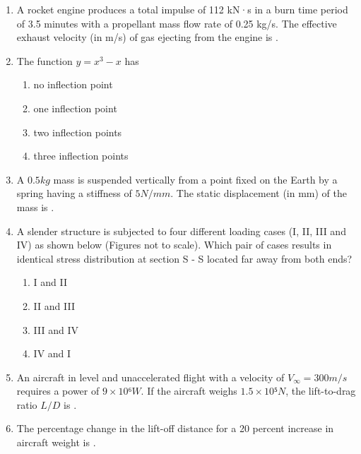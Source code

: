 \documentclass{article}
\begin{document}
\begin{enumerate}
\item A rocket engine produces a total impulse of 112 kN·s in a burn time period of 3.5 minutes with a propellant mass flow rate of 0.25 kg/s. The effective exhaust velocity (in m/s) of gas ejecting from the engine is \underline{\hspace{2cm}}.


\item The function $y = x^3 - x$ has

\begin{multicols}{4}
\begin{enumerate}
\item no inflection point
\item one inflection point
\item two inflection points
\item three inflection points
\end{enumerate}
\end{multicols}

\item A $0.5 kg$ mass is suspended vertically from a point fixed on the Earth by a spring having a stiffness of $5 N/mm$. The static displacement (in mm) of the mass is \underline{\hspace{2cm}}.


\item A slender structure is subjected to four different loading cases (I, II, III and IV) as shown below (Figures not to scale). Which pair of cases results in identical stress distribution at section S - S located far away from both ends?

\begin{multicols}{4}
\begin{enumerate}
\item I and II
\item II and III
\item III and IV
\item IV and I
\end{enumerate}
\end{multicols}

\item An aircraft in level and unaccelerated flight with a velocity of $V_\infty = 300 m/s$ requires a power of $9 × 10⁶ W$. If the aircraft weighs $1.5 × 10⁵ N$, the lift-to-drag ratio $L/D$ is \underline{\hspace{2cm}}.


\item The percentage change in the lift-off distance for a 20 percent increase in aircraft weight is \underline{\hspace{2cm}}.



\end{enumerate}
\end{document}

